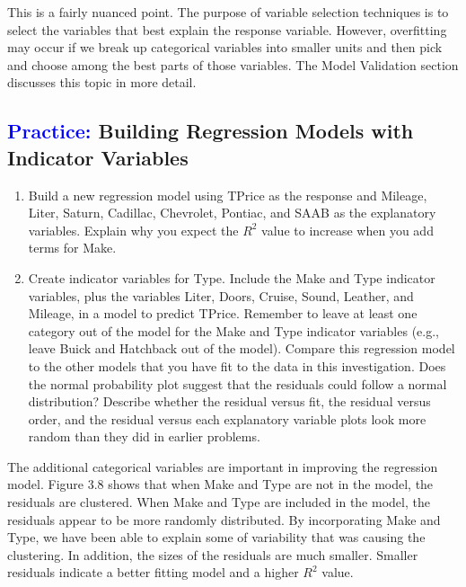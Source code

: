 \documentclass[
]{report}
\begin{document}
This is a fairly nuanced point. The purpose of variable selection techniques is to select the variables that best explain the response variable. However, overfitting may occur if we break up categorical variables into smaller units and then pick and choose among the best parts of those variables. The Model Validation section
discusses this topic in more detail.

\hypertarget{building-regression-models-with-indicator-variables}{%
\subsection*{\texorpdfstring{\textcolor{blue}{Practice:} Building Regression Models with Indicator Variables}{ Building Regression Models with Indicator Variables}}\label{building-regression-models-with-indicator-variables}}

\begin{enumerate}
\def\labelenumi{\arabic{enumi}.}
\setcounter{enumi}{18}
\item
  Build a new regression model using TPrice as the response and Mileage, Liter, Saturn, Cadillac, Chevrolet, Pontiac, and SAAB as the explanatory variables. Explain why you expect the \(\scriptstyle {R}^2\) value to increase when you add terms for Make.
\item
  Create indicator variables for Type. Include the Make and Type indicator variables, plus the variables Liter, Doors, Cruise, Sound, Leather, and Mileage, in a model to predict TPrice. Remember to leave at least one category out of the model for the Make and Type indicator variables (e.g., leave Buick and Hatchback out of the model). Compare this regression model to the other models that you have fit to the data in this investigation. Does the normal probability plot suggest that the residuals could follow a normal distribution? Describe whether the residual versus fit, the residual versus order, and the residual versus each explanatory variable plots look more random than they did in earlier problems.
\end{enumerate}

The additional categorical variables are important in improving the regression model. Figure 3.8 shows that when Make and Type are not in the model, the residuals are clustered. When Make and Type are included in the model, the residuals appear to be more randomly distributed. By incorporating Make and Type, we have been able to explain some of variability that was causing the clustering. In addition, the sizes of the residuals are much smaller. Smaller residuals indicate a better fitting model and a higher \(\scriptstyle {R}^2\) value.
\end{document}
